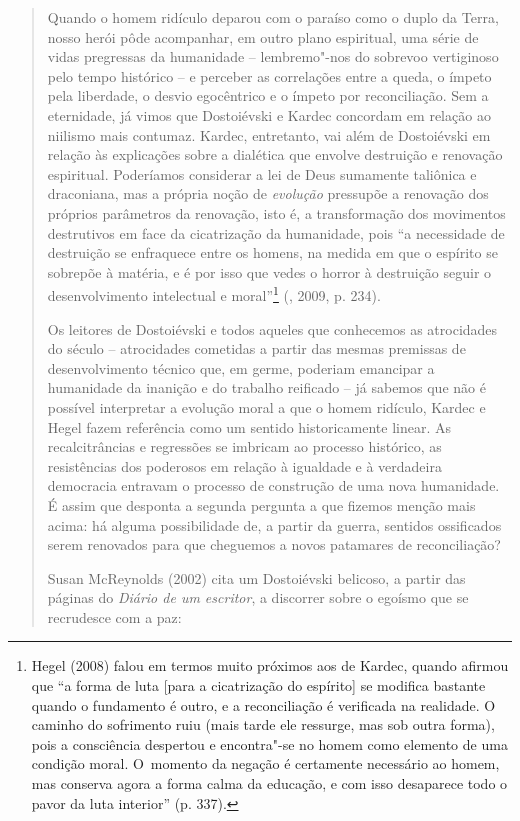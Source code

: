 {\begin{quote}
Quando o homem ridículo deparou com o paraíso como o duplo da Terra,
nosso herói pôde acompanhar, em outro plano espiritual, uma série de
vidas pregressas da humanidade -- lembremo"-nos do sobrevoo vertiginoso
pelo tempo histórico -- e perceber as correlações entre a queda, o
ímpeto pela liberdade, o desvio egocêntrico e o ímpeto por
reconciliação. Sem a eternidade, já vimos que Dostoiévski e Kardec
concordam em relação ao niilismo mais contumaz. Kardec, entretanto, vai
além de Dostoiévski em relação às explicações sobre a dialética que
envolve destruição e renovação espiritual. Poderíamos considerar a lei
de Deus sumamente taliônica e draconiana, mas a própria noção de
\emph{evolução} pressupõe a renovação dos próprios parâmetros da
renovação, isto é, a transformação dos movimentos destrutivos em face da
cicatrização da humanidade, pois ``a necessidade de destruição se
enfraquece entre os homens, na medida em que o espírito se sobrepõe à
matéria, e é por isso que vedes o horror à destruição seguir o
desenvolvimento intelectual e moral''\footnote{Hegel (2008) falou em
  termos muito próximos aos de Kardec, quando afirmou que ``a forma de
  luta {[}para a cicatrização do espírito{]} se modifica bastante quando
  o fundamento é outro, e a reconciliação é verificada na realidade. O
  caminho do sofrimento ruiu (mais tarde ele ressurge, mas sob outra
  forma), pois a consciência despertou e encontra"-se no homem como
  elemento de uma condição moral. O~momento da negação é certamente
  necessário ao homem, mas conserva agora a forma calma da educação, e
  com isso desaparece todo o pavor da luta interior'' (p. 337).}
(, 2009, p. 234).

Os leitores de Dostoiévski e todos aqueles que conhecemos as atrocidades
do século  -- atrocidades cometidas a partir das mesmas premissas de
desenvolvimento técnico que, em germe, poderiam emancipar a humanidade
da inanição e do trabalho reificado -- já sabemos que não é possível
interpretar a evolução moral a que o homem ridículo, Kardec e Hegel
fazem referência como um sentido historicamente linear. As
recalcitrâncias e regressões se imbricam ao processo histórico, as
resistências dos poderosos em relação à igualdade e à verdadeira
democracia entravam o processo de construção de uma nova humanidade. É
assim que desponta a segunda pergunta a que fizemos menção mais acima:
há alguma possibilidade de, a partir da guerra, sentidos ossificados
serem renovados para que cheguemos a novos patamares de reconciliação?

Susan McReynolds (2002) cita um Dostoiévski belicoso, a partir das
páginas do \emph{Diário de um escritor}, a discorrer sobre o egoísmo que
se recrudesce com a paz:


\end{quote}}
